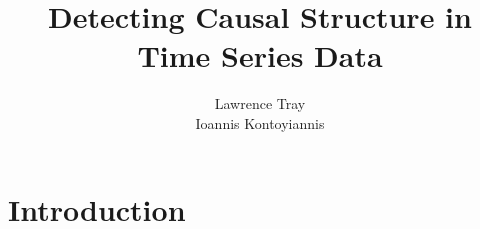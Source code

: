\documentclass[]{article}
\title{Detecting Causal Structure in Time Series Data}
\author{Lawrence Tray \\ Ioannis Kontoyiannis}
\begin{document}
\maketitle

\begin{abstract}
\end{abstract}

\section{Introduction}
\end{document}
